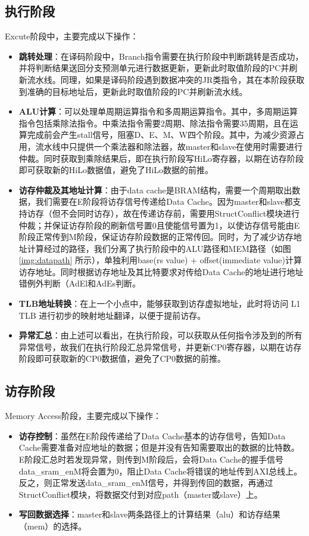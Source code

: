 \subsection{执行阶段}
Excute阶段中，主要完成以下操作：
\begin{itemize}
    \item \textbf{跳转处理}：在译码阶段中，Branch指令需要在执行阶段中判断跳转是否成功，并将判断结果送回分支预测单元进行数据更新，更新此时取值阶段的PC并刷新流水线。同理，如果是译码阶段遇到数据冲突的JR类指令，其在本阶段获取到准确的目标地址后，更新此时取值阶段的PC并刷新流水线。
    \item \textbf{ALU计算}：可以处理单周期运算指令和多周期运算指令。其中，多周期运算指令包括乘除法指令。\cpuname 中乘法指令需要2周期、除法指令需要35周期，且在运算完成前会产生stall信号，阻塞D、E、M、W四个阶段。其中，为减少资源占用，流水线中只提供一个乘法器和除法器，故master和slave在使用时需要进行仲裁。同时获取到乘除结果后，即在执行阶段写HiLo寄存器，以期在访存阶段即可获取新的HiLo数据值，避免了HiLo数据的前推。
    \item \textbf{访存仲裁及其地址计算}：由于data cache是BRAM结构，需要一个周期取出数据，我们需要在E阶段将访存信号传递给Data Cache。因为master和slave都支持访存（但不会同时访存），故在传递访存前，需要用StructConflict模块进行仲裁；并保证访存阶段的刷新信号置0且使能信号置为1，以使访存信号能由E阶段正常传到M阶段，保证访存阶段数据的正常传回。同时，为了减少访存地址计算经过的路径，我们分离了执行阶段中的ALU路径和MEM路径（如图 \ref{img:datapath} 所示），单独利用base(rs value) + offset(immediate value)计算访存地址。同时根据访存地址及其比特要求对传给Data Cache的地址进行地址错例外判断（AdEl和AdEs判断。
    \item \textbf{TLB地址转换}：在上一个小点中，能够获取到访存虚拟地址，此时将访问 L1 TLB 进行初步的映射地址翻译，以便于提前访存。
    \item \textbf{异常汇总}：由上述可以看出，在执行阶段，可以获取从任何指令涉及到的所有异常信号，故我们在执行阶段汇总异常信号，并更新CP0寄存器，以期在访存阶段即可获取新的CP0数据值，避免了CP0数据的前推。
\end{itemize}

\subsection{访存阶段}
Memory Access阶段，主要完成以下操作：

\begin{itemize}
    \item \textbf{访存控制}：虽然在E阶段传递给了Data Cache基本的访存信号，告知Data Cache需要准备对应地址的数据；但是并没有告知需要取出的数据的比特数。E阶段汇总时若发现异常，则传到M阶段后，会将Data Cache的握手信号data\_sram\_enM将会置为0，阻止Data Cache将错误的地址传到AXI总线上。反之，则正常发送data\_sram\_enM信号，并得到传回的数据，再通过StructConflict模块，将数据交付到对应path（master或slave）上。
    \item \textbf{写回数据选择}：master和slave两条路径上的计算结果（alu）和访存结果（mem）的选择。
\end{itemize}

